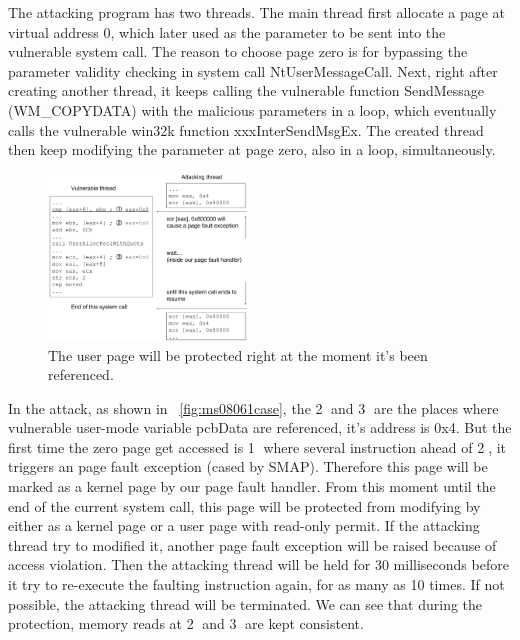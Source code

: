 The attacking program has two threads. The main thread first allocate a page at virtual address 0, which later used as the parameter to be sent into the vulnerable system call. The reason to choose page zero is for bypassing the parameter validity checking in system call NtUserMessageCall. Next, right after creating another thread, it keeps calling the vulnerable function SendMessage (WM\_COPYDATA) with the malicious parameters in a loop, which eventually calls the vulnerable win32k function xxxInterSendMsgEx. The created thread then keep modifying the parameter at page zero, also in a loop, simultaneously.

\begin{figure}[th]
  \includegraphics[width=0.47\textwidth]{figures/ms08061case}
  \centering
  \caption{The user page will be protected right at the moment it's been referenced.}
  \label{fig:ms08061case}
\end{figure}

In the attack, as shown in ~\autoref{fig:ms08061case}, the \textcircled{2} and \textcircled{3} are the places where vulnerable user-mode variable pcbData are referenced, it's address is 0x4. But the first time the zero page get accessed is \textcircled{1} where several instruction ahead of \textcircled{2}, it triggers an page fault exception (cased by SMAP). Therefore this page will be marked as a kernel page by our page fault handler. From this moment until the end of the current system call, this page will be protected from modifying by either as a kernel page or a user page with read-only permit. If the attacking thread try to modified it, another page fault exception  will be raised because of access violation. Then the attacking thread will be held for 30 milliseconds before it try to re-execute the faulting instruction again, for as many as 10 times. If not possible, the attacking thread will be terminated. We can see that during the protection, memory reads at \textcircled{2} and \textcircled{3} are kept consistent.



